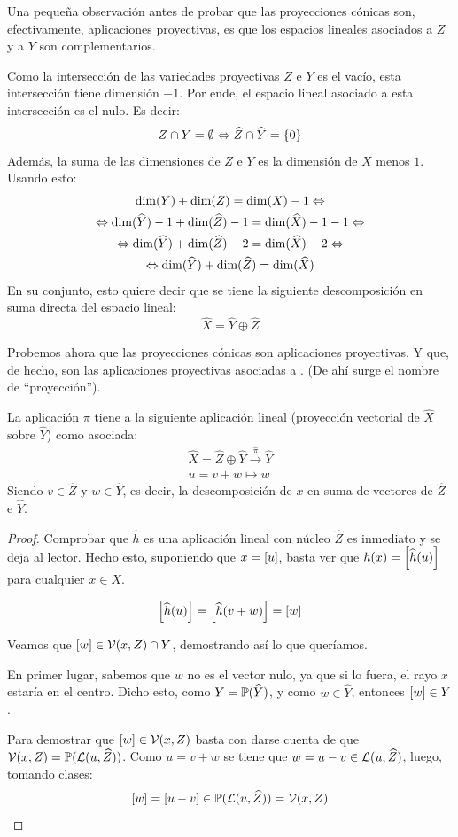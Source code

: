 Una pequeña observación antes de probar que las proyecciones cónicas son, efectivamente, aplicaciones proyectivas, es que los espacios lineales asociados a $Z$ y a $Y$ son complementarios.
\begin{obs}
	\label{C4_obs_espaciosComplementarios}
	Como la intersección de las variedades proyectivas $Z$ e $Y$ es el vacío, esta intersección tiene dimensión $-1$. Por ende, el espacio lineal asociado a esta intersección es el nulo. Es decir:
	\[Z\cap Y=\emptyset\Leftrightarrow\widehat{Z}\cap\widehat{Y}=\{0\}\]
	Además, la suma de las dimensiones de $Z$ e $Y$ es la dimensión de $X$ menos $1$. Usando esto:
	\begin{multline*}
		\dim(Y)+\dim(Z)=\dim(X)-1\Leftrightarrow\\
		\Leftrightarrow \dim(\widehat{Y})-1+\dim(\widehat{Z})-1=\dim(\widehat{X})-1-1\Leftrightarrow\\
		\Leftrightarrow \dim(\widehat{Y})+\dim(\widehat{Z})-2=\dim(\widehat{X})-2\Leftrightarrow\\
		\Leftrightarrow \dim(\widehat{Y})+\dim(\widehat{Z})=\dim(\widehat{X})
	\end{multline*}
	En su conjunto, esto quiere decir que se tiene la siguiente descomposición en suma directa del espacio lineal:
	\[\widehat{X}=\widehat{Y}\oplus\widehat{Z}\]
\end{obs}
Probemos ahora que las proyecciones cónicas son aplicaciones proyectivas. Y que, de hecho, son las aplicaciones proyectivas asociadas a . (De ahí surge el nombre de ``proyección'').
\begin{prop}
	\label{C4_prop_proyeccionVectorial}
	La aplicación $\pi$ tiene a la siguiente aplicación lineal (proyección vectorial de $\widehat{X}$ sobre $\widehat{Y}$) como asociada:
	\[\begin{array}{c}
	\widehat{X}=\widehat{Z}\oplus\widehat{Y}\stackrel{\widehat{\pi}}{\to}\widehat{Y}\\
	u=v+w\mapsto w
	\end{array}\]
	Siendo $v\in \widehat{Z}$ y $w\in \widehat{Y}$, es decir, la descomposición de $x$ en suma de vectores de $\widehat{Z}$ e $\widehat{Y}$.
\end{prop}
\begin{proof}
	Comprobar que $\widehat{h}$ es una aplicación lineal con núcleo $\widehat{Z}$ es inmediato y se deja al lector. Hecho esto, suponiendo que $x=\left [ u \right ]$, basta ver que $h(x)=\left [ \widehat{h}(u) \right ]$ para cualquier $x\in X$.
	
	\[\left [ \widehat{h}(u) \right ]=\left [ \widehat{h}(v+w) \right ]=\left [ w \right ]\]
	
	Veamos que $\left [ w \right ]\in \mathcal{V}(x,Z)\cap Y$, demostrando así lo que queríamos.
	
	En primer lugar, sabemos que $w$ no es el vector nulo, ya que si lo fuera, el rayo $x$ estaría en el centro. Dicho esto, como $Y=\mathbb{P}(\widehat{Y})$, y como $w\in\widehat{Y}$, entonces $\left [ w \right ]\in Y$.
	
	Para demostrar que $\left [ w \right ]\in\mathcal{V}(x,Z)$ basta con darse cuenta de que $\mathcal{V}(x,Z)=\mathbb{P}({\mathcal{L}(u,\widehat{Z})})$. Como $u = v+w$ se tiene que $w=u-v\in\mathcal{L}(u, \widehat{Z})$, luego, tomando clases: \[\left [ w \right ]=\left [ u-v \right ]\in\mathbb{P}(\mathcal{L}(u,\widehat{Z}))=\mathcal{V}(x,Z)\]
\end{proof}

